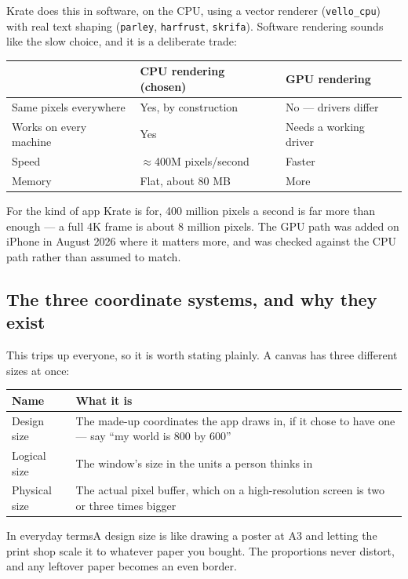 \documentclass[11pt,a4paper]{report}
\newcommand{\analogy}[1]{\begin{plainbox}{In everyday terms}#1\end{plainbox}}
\begin{document}
Krate does this in software, on the CPU, using a vector renderer
(\texttt{vello\_cpu}) with real text shaping (\texttt{parley},
\texttt{harfrust}, \texttt{skrifa}). Software rendering sounds like the slow
choice, and it is a deliberate trade:

\begin{center}
\begin{tabular}{lp{4.7cm}p{4.7cm}}
\toprule
& \textbf{CPU rendering (chosen)} & \textbf{GPU rendering} \\
\midrule
Same pixels everywhere & Yes, by construction & No --- drivers differ \\
Works on every machine & Yes & Needs a working driver \\
Speed & $\approx$400M pixels/second & Faster \\
Memory & Flat, about 80 MB & More \\
\bottomrule
\end{tabular}
\end{center}

For the kind of app Krate is for, 400 million pixels a second is far more
than enough --- a full 4K frame is about 8 million pixels. The GPU path was
added on iPhone in August 2026 where it matters more, and was checked
against the CPU path rather than assumed to match.

\subsection{The three coordinate systems, and why they exist}

This trips up everyone, so it is worth stating plainly. A canvas has three
different sizes at once:

\begin{center}
\begin{tabular}{lp{8.6cm}}
\toprule
\textbf{Name} & \textbf{What it is} \\
\midrule
Design size & The made-up coordinates the app draws in, if it chose to have
  one --- say ``my world is 800 by 600'' \\
Logical size & The window's size in the units a person thinks in \\
Physical size & The actual pixel buffer, which on a high-resolution screen
  is two or three times bigger \\
\bottomrule
\end{tabular}
\end{center}

\analogy{A design size is like drawing a poster at A3 and letting the print
shop scale it to whatever paper you bought. The proportions never distort,
and any leftover paper becomes an even border.}
\end{document}
